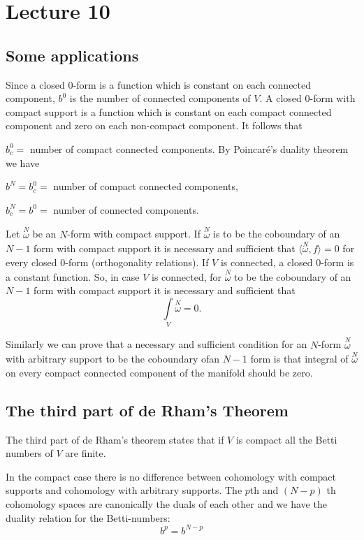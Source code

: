 \chapter{Lecture 10}

\section*{Some applications}\pageoriginale

Since a closed $0$-form is a function which is constant on each
connected component, $b^{0}$ is the number of connected components of
$V$. A closed $0$-form with compact support is a function which is
constant on each compact connected component and zero on each
non-compact component. It follows that

$b^{0}_{c}=$ number of compact connected components. By Poincar\'e's
duality theorem we have

$b^{N}=b^{0}_{c}=$ number of compact connected components,

$b^{N}_{c}=b^{0}=$ number of connected components.

Let $\overset{N}{\omega}$ be an $N$-form with compact support. If
$\overset{N}{\omega}$ is to be the coboundary of an $N-1$ form with
compact support it is necessary and sufficient that
$\langle\overset{N}{\omega},f\rangle=0$ for every closed $0$-form
(orthogonality relations). If $V$ is connected, a closed $0$-form is a
constant function. So, in case $V$ is connected, for
$\overset{N}{\omega}$ to be the coboundary of an $N-1$ form with
compact support it is necessary and sufficient that
$$
\int\limits_{V}\overset{N}{\omega}=0.
$$

Similarly we can prove that a necessary and sufficient condition for
an $N$-form $\overset{N}{\omega}$ with arbitrary support to be the
coboundary of\pageoriginale an $N-1$ form is that integral of
$\overset{N}{\omega}$ on every compact connected component of the
manifold should be zero.

\section*{The third part of de Rham's Theorem}

The third part of de Rham's theorem states that if $V$ is compact all
the Betti numbers of $V$ are finite.

In the compact case there is no difference between cohomology with
compact supports and cohomology with arbitrary supports. The $p$th 
and $(N-p)$ th cohomology spaces are canonically the duals of each
other and we have the duality relation for the Betti-numbers:
$$
b^{p}=b^{N-p}
$$

